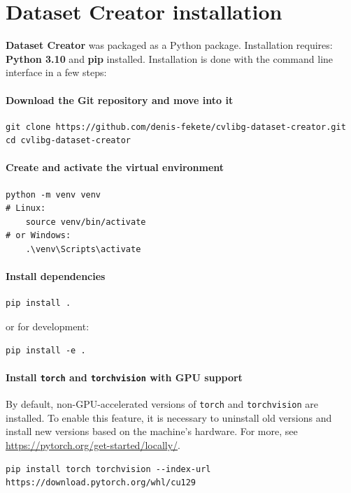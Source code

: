 \chapter{Dataset Creator installation}
\label{datasetCreatorInstall}
\textbf{Dataset Creator} was packaged as a Python package. Installation requires: \textbf{Python 3.10} and \textbf{pip} installed. Installation is done with the command line interface in a few steps:

\subsubsection{Download the Git repository and move into it}
\begin{lstlisting}
git clone https://github.com/denis-fekete/cvlibg-dataset-creator.git
cd cvlibg-dataset-creator
\end{lstlisting}

\subsubsection{Create and activate the virtual environment}
\begin{lstlisting}
python -m venv venv
# Linux:
    source venv/bin/activate
# or Windows:
    .\venv\Scripts\activate
\end{lstlisting}

\subsubsection{Install dependencies}
\begin{lstlisting}
pip install .
\end{lstlisting}
or for development:
\begin{lstlisting}
pip install -e .
\end{lstlisting}

\subsubsection{Install \texttt{torch} and \texttt{torchvision} with GPU support}
By default, non-GPU-accelerated versions of \texttt{torch} and \texttt{torchvision} are installed. To enable this feature, it is necessary to uninstall old versions and install new versions based on the machine's hardware. For more, see \url{https://pytorch.org/get-started/locally/}.
\begin{lstlisting}[breaklines=true]
pip install torch torchvision --index-url https://download.pytorch.org/whl/cu129
\end{lstlisting}

